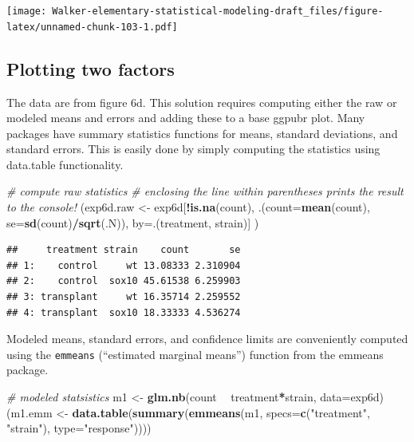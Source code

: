 \documentclass[]{book}
\newenvironment{Shaded}{\begin{snugshade}}{\end{snugshade}}
\newcommand{\CommentTok}[1]{\textcolor[rgb]{0.56,0.35,0.01}{\textit{#1}}}
\newcommand{\DataTypeTok}[1]{\textcolor[rgb]{0.13,0.29,0.53}{#1}}
\newcommand{\KeywordTok}[1]{\textcolor[rgb]{0.13,0.29,0.53}{\textbf{#1}}}
\newcommand{\NormalTok}[1]{#1}
\newcommand{\OperatorTok}[1]{\textcolor[rgb]{0.81,0.36,0.00}{\textbf{#1}}}
\newcommand{\StringTok}[1]{\textcolor[rgb]{0.31,0.60,0.02}{#1}}
\begin{document}
\texttt{[image: Walker-elementary-statistical-modeling-draft\_files/figure-latex/unnamed-chunk-103-1.pdf]}

\hypertarget{plotting-two-factors}{%
\subsection{Plotting two factors}\label{plotting-two-factors}}

The data are from figure 6d. This solution requires computing either the raw or modeled means and errors and adding these to a base ggpubr plot. Many packages have summary statistics functions for means, standard deviations, and standard errors. This is easily done by simply computing the statistics using data.table functionality.

\begin{Shaded}
\begin{Highlighting}[]
\CommentTok{# compute raw statistics}
\CommentTok{# enclosing the line within parentheses prints the result to the console!}
\NormalTok{(exp6d.raw <-}\StringTok{ }\NormalTok{exp6d[}\OperatorTok{!}\KeywordTok{is.na}\NormalTok{(count), .(}\DataTypeTok{count=}\KeywordTok{mean}\NormalTok{(count),}
                       \DataTypeTok{se=}\KeywordTok{sd}\NormalTok{(count)}\OperatorTok{/}\KeywordTok{sqrt}\NormalTok{(.N)),}
                   \DataTypeTok{by=}\NormalTok{.(treatment, strain)]}
\NormalTok{)}
\end{Highlighting}
\end{Shaded}

\begin{verbatim}
##     treatment strain    count       se
## 1:    control     wt 13.08333 2.310904
## 2:    control  sox10 45.61538 6.259903
## 3: transplant     wt 16.35714 2.259552
## 4: transplant  sox10 18.33333 4.536274
\end{verbatim}

Modeled means, standard errors, and confidence limits are conveniently computed using the \texttt{emmeans} (``estimated marginal means'') function from the emmeans package.

\begin{Shaded}
\begin{Highlighting}[]
\CommentTok{# modeled statsistics}
\NormalTok{m1 <-}\StringTok{ }\KeywordTok{glm.nb}\NormalTok{(count }\OperatorTok{~}\StringTok{ }\NormalTok{treatment}\OperatorTok{*}\NormalTok{strain, }\DataTypeTok{data=}\NormalTok{exp6d)}
\NormalTok{(m1.emm <-}\StringTok{ }\KeywordTok{data.table}\NormalTok{(}\KeywordTok{summary}\NormalTok{(}\KeywordTok{emmeans}\NormalTok{(m1, }\DataTypeTok{specs=}\KeywordTok{c}\NormalTok{(}\StringTok{"treatment"}\NormalTok{, }\StringTok{"strain"}\NormalTok{), }\DataTypeTok{type=}\StringTok{"response"}\NormalTok{))))}
\end{Highlighting}
\end{Shaded}
\end{document}
